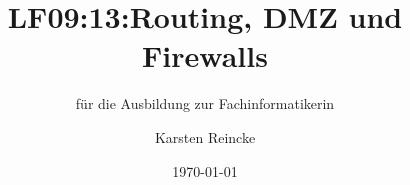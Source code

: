 \documentclass[]{beamer}
\title{LF09:13:Routing, DMZ und Firewalls}
\subtitle{für die Ausbildung zur Fachinformatikerin}
\institute{GS-LDK}
\author{Karsten Reincke}
\date{\today}
\def\cfgGl{../../../cfg.gl/}
\begin{document}

\begin{frame}
  \titlepage
\end{frame}






\logo{}
\newpage




\end{document}
